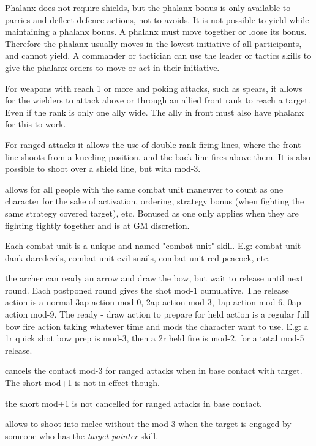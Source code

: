 Phalanx does not require shields, but the phalanx bonus is only available to parries and deflect defence actions, not to avoids.
It is not possible to yield while maintaining a phalanx bonus. A phalanx must move together or loose its bonus. Therefore the phalanx usually moves in the lowest initiative of all participants, and cannot yield. A commander or tactician can use the leader or tactics skills to give the phalanx orders to move or act in their initiative.

For weapons with reach 1 or more and poking attacks, such as spears, it allows for the wielders to attack above or through an allied front rank to reach a target. Even if the rank is only one ally wide. The ally in front must also have phalanx for this to work.

For ranged attacks it allows the use of double rank firing lines, where the front line shoots from a kneeling position, and the back line fires above them. It is also possible to shoot over a shield line, but with mod-3.


 allows for all people with the same combat unit maneuver to count as one character for the sake of activation, ordering, strategy bonus (when fighting the same strategy covered target), etc. Bonused as one only applies when they are fighting tightly together and is at GM discretion.

Each combat unit is a unique and named "combat unit" skill. E.g: combat unit dank daredevils, combat unit evil snails, combat unit red peacock, etc.


 the archer can ready an arrow and draw the bow, but wait to release until next round. Each postponed round gives the shot mod-1 cumulative. The release action is a normal 3ap action mod-0, 2ap action mod-3, 1ap action mod-6, 0ap action mod-9.
The ready - draw action to prepare for held action is a regular full bow fire action taking whatever time and mods the character want to use.
E.g: a 1r quick shot bow prep is mod-3, then a 2r held fire is mod-2, for a total mod-5 release.


 cancels the contact mod-3 for ranged attacks when in base contact with target. The short mod+1 is not in effect though.


 the short mod+1 is not cancelled for ranged attacks in base contact.


 allows to shoot into melee without the mod-3 when the target is engaged by someone who has the \emph{target pointer} skill.

